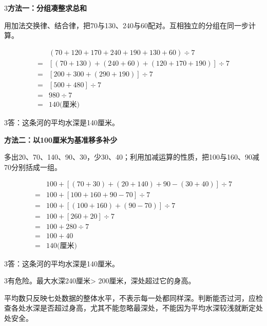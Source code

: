 \documentclass[multi=snippet,border={5bp 20bp 5bp 5bp}]{standalone}
\newenvironment{snippet}[3]{\begin{minipage}{#1bp}\color{answerred}\fontsize{#2}{#3}\selectfont\raggedright}{\end{minipage}}
\begin{document}
\begin{snippet}{505}{11.5}{14}\begin{multicols}{3}\raggedcolumns \textbf{方法一：分组凑整求总和}\par 用加法交换律、结合律，把70与130、240与60配对。互相独立的分组在同一步计算。\end{multicols}\[\begin{aligned}&(70+120+170+240+190+130+60)\div7\\={}&[(70+130)+(240+60)+(120+170+190)]\div7\\={}&[200+300+(290+190)]\div7\\={}&[500+480]\div7\\={}&980\div7\\={}&140\text{(厘米)}\end{aligned}\]\begin{multicols}{3}\raggedcolumns 答：这条河的平均水深是140厘米。\par\textbf{方法二：以100厘米为基准移多补少}\par 多出20、70、140、90、30，少30、40；利用加减运算的性质，把100与160、90减70分别括成一组。\end{multicols}\[\begin{aligned}&100+[(70+30)+(20+140)+90-(30+40)]\div7\\={}&100+[100+160+90-70]\div7\\={}&100+[(100+160)+(90-70)]\div7\\={}&100+[260+20]\div7\\={}&100+280\div7\\={}&100+40\\={}&140\text{(厘米)}\end{aligned}\]\begin{multicols}{3}\raggedcolumns 答：这条河的平均水深是140厘米。\end{multicols}\end{snippet}
\begin{snippet}{505}{11.5}{14}\begin{multicols}{3}\raggedcolumns 有危险。最大水深240厘米> 200厘米，深处超过它的身高。\par 平均数只反映七处数据的整体水平，不表示每一处都同样深。判断能否过河，应检查各处水深是否超过身高，尤其不能忽略最深处，不能因为平均水深较浅就断定处处安全。\end{multicols}\end{snippet}
\end{document}
